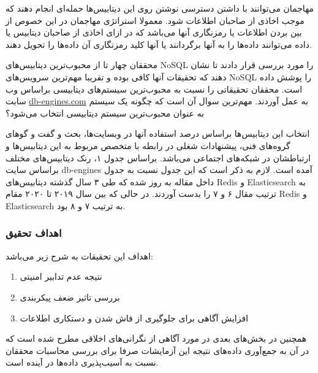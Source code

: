 \documentclass[10pt, a4paper]{article}
\begin{document}
مهاجمان می‌توانند با داشتن دسترسی نوشتن روی این دیتابیس‌ها حمله‌ای انجام دهند که
موجب اخاذی از صاحبان اطلاعات شود. معمولا استراتژی مهاجمان در این خصوص از بین
بردن اطلاعات یا رمزنگاری‌ آنها می‌باشد که در ازای اخاذی از صاحبان دیتابیس یا
داده می‌توانند داده‌ها را به آنها برگردانند یا آنها کلید رمزنگاری آن داده‌ها را
تحویل دهند.

محققان چهار تا از محبوب‌‌ترین دیتابیس‌های NoSQL را مورد بررسی قرار دادند تا نشان
دهند که تحقیقات آنها کافی بوده و تقریبا مهم‌ترین سرویس‌های NoSQL را پوشش داده
است. محققان تحقیقاتی را نسبت به محبوب‌ترین سیستم‌های دیتابیسی براساس وب سایت
\href{https://db-engines.com/en/ranking}{db-engines.com} به عمل آوردند. مهم‌ترین
سوال آن است که چگونه یک سیستم به عنوان محبوب‌ترین سیستم دیتابیسی انتخاب می‌شود؟

انتخاب این دیتابیس‌ها براساس درصد استفاده آنها در وبسایت‌ها، بحث و گفت و گو‌های
گروه‌های فنی، پیشنهادات شغلی در رابطه با متخصص مربوط به این دیتابیس‌ها و
ارتباطشان در شبکه‌های اجتماعی می‌باشد. براساس جدول ۱، رنک دیتابیس‌های مختلف
براساس سایت db-engines آمده است. لازم به ذکر است که این جدول نسبت به جدول داخل
مقاله به روز شده که طی ۳ سال گذشته دیتابیس‌های Redis و Elasticsearch به ترتیب
مقال ۶ و ۷ را بدست آوردند. در حالی که بین سال ۲۰۱۹ تا ۲۰۲۰ مقام Redis و
Elasticsearch به ترتیب ۷ و ۸ بود.

\subsubsection{اهداف تحقیق}

اهداف این تحقیقات به شرح زیر می‌باشد:

 \begin{enumerate}
    \item نتیجه عدم تدابیر امنیتی
    \item بررسی تاثیر ضعف پیکربندی
    \item افزایش آگاهی برای جلوگیری از فاش شدن و دستکاری اطلاعات
 \end{enumerate}

همچنین در بخش‌های بعدی در مورد آگاهی از نگرانی‌های اخلاقی مطرح شده است که در آن
به جمع‌آوری داده‌‌های نتیجه این آزمایشات صرفا برای بررسی محاسبات محققان نسبت به
آسیب‌پذیری داده‌ها در آینده است.
\end{document}
